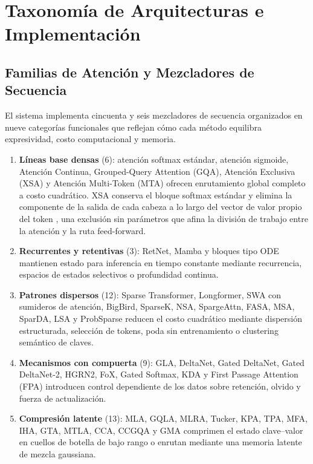 \section{Taxonomía de Arquitecturas e Implementación}
\label{sec:architecture-taxonomy}

\subsection{Familias de Atención y Mezcladores de Secuencia}
\label{sec:attention-families}

El sistema implementa cincuenta y seis mezcladores de secuencia organizados en nueve categorías funcionales que reflejan cómo cada método equilibra expresividad, costo computacional y memoria.
\begin{enumerate}[leftmargin=*]
    \item \textbf{Líneas base densas} (6): atención softmax estándar, atención sigmoide, Atención Continua, Grouped-Query Attention (GQA), Atención Exclusiva (XSA) y Atención Multi-Token (MTA) ofrecen enrutamiento global completo a costo cuadrático. XSA conserva el bloque softmax estándar y elimina la componente de la salida de cada cabeza a lo largo del vector de valor propio del token \citep{zhai_exclusive_2026}, una exclusión sin parámetros que afina la división de trabajo entre la atención y la ruta feed-forward.
    \item \textbf{Recurrentes y retentivas} (3): RetNet, Mamba y bloques tipo ODE mantienen estado para inferencia en tiempo constante mediante recurrencia, espacios de estados selectivos o profundidad continua.
    \item \textbf{Patrones dispersos} (12): Sparse Transformer, Longformer, SWA con sumideros de atención, BigBird, SparseK, NSA, SpargeAttn, FASA, MSA, SparDA, LSA y ProbSparse reducen el costo cuadrático mediante dispersión estructurada, selección de tokens, poda sin entrenamiento o clustering semántico de claves.
    \item \textbf{Mecanismos con compuerta} (9): GLA, DeltaNet, Gated DeltaNet, Gated DeltaNet-2, HGRN2, FoX, Gated Softmax, KDA y First Passage Attention (FPA) introducen control dependiente de los datos sobre retención, olvido y fuerza de actualización.
    \item \textbf{Compresión latente} (13): MLA, GQLA, MLRA, Tucker, KPA, TPA, MFA, IHA, GTA, MTLA, CCA, CCGQA y GMA comprimen el estado clave--valor en cuellos de botella de bajo rango o enrutan mediante una memoria latente de mezcla gaussiana.

\end{enumerate}
